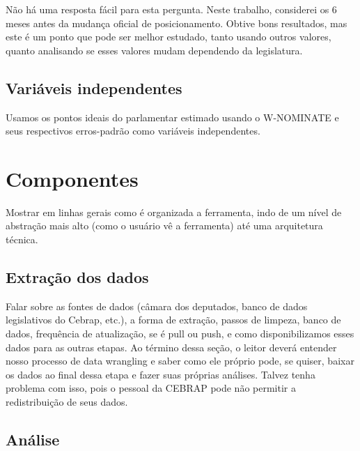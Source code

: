 \documentclass[a4paper,titlepage]{ppgi}\usepackage[]{graphicx}\usepackage[]{color}
\begin{document}
Não há uma resposta fácil para esta pergunta. Neste trabalho, considerei os 6
meses antes da mudança oficial de posicionamento. Obtive bons resultados, mas
este é um ponto que pode ser melhor estudado, tanto usando outros valores,
quanto analisando se esses valores mudam dependendo da legislatura.

\subsection{Variáveis independentes}

Usamos os pontos ideais do parlamentar estimado usando o W-NOMINATE e seus
respectivos erros-padrão como variáveis independentes.

\section{Componentes}

Mostrar em linhas gerais como é organizada a ferramenta, indo de um nível de abstração mais alto (como o usuário vê a ferramenta) até uma arquitetura técnica.




\subsection{Extração dos dados}

Falar sobre as fontes de dados (câmara dos deputados, banco de dados legislativos do Cebrap, etc.), a forma de extração, passos de limpeza, banco de dados, frequência de atualização, se é pull ou push, e como disponibilizamos esses dados para as outras etapas. Ao término dessa seção, o leitor deverá entender nosso processo de data wrangling e saber como ele próprio pode, se quiser, baixar os dados ao final dessa etapa e fazer suas próprias análises. Talvez tenha problema com isso, pois o pessoal da CEBRAP pode não permitir a redistribuição de seus dados.



\subsection{Análise}
\end{document}

